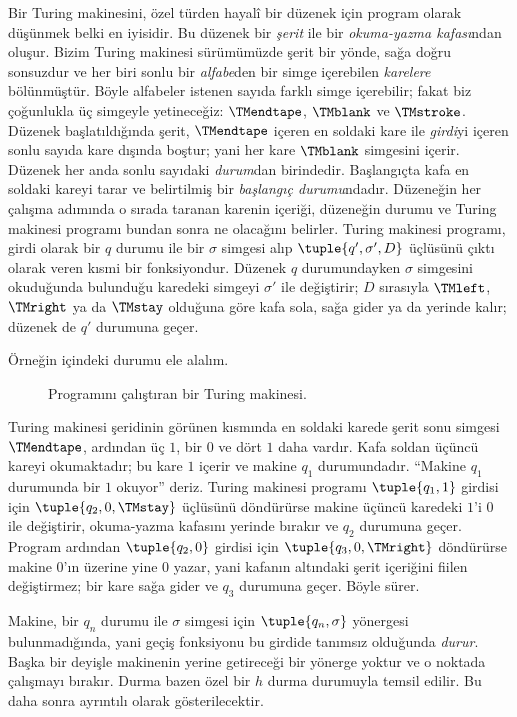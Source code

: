 \begin{explain}
Bir Turing makinesini, özel türden hayalî bir düzenek için program olarak
düşünmek belki en iyisidir. Bu düzenek bir \emph{şerit} ile bir
\emph{okuma-yazma kafası}ndan oluşur. Bizim Turing makinesi sürümümüzde şerit
bir yönde, sağa doğru sonsuzdur ve her biri sonlu bir \emph{alfabe}den bir
simge içerebilen \emph{karelere} bölünmüştür. Böyle alfabeler istenen sayıda
farklı simge içerebilir; fakat biz çoğunlukla üç simgeyle yetineceğiz:
$\TMendtape$, $\TMblank$ ve $\TMstroke$. Düzenek başlatıldığında şerit,
$\TMendtape$ içeren en soldaki kare ile \emph{girdi}yi içeren sonlu sayıda
kare dışında boştur; yani her kare $\TMblank$ simgesini içerir. Düzenek her
anda sonlu sayıdaki \emph{durum}dan birindedir. Başlangıçta kafa en soldaki
kareyi tarar ve belirtilmiş bir \emph{başlangıç durumu}ndadır. Düzeneğin her
çalışma adımında o sırada taranan karenin içeriği, düzeneğin durumu ve Turing
makinesi programı bundan sonra ne olacağını belirler. Turing makinesi programı,
girdi olarak bir $q$ durumu ile bir $\sigma$ simgesi alıp
$\tuple{q',\sigma',D}$ üçlüsünü çıktı olarak veren kısmi bir fonksiyondur.
Düzenek $q$ durumundayken $\sigma$ simgesini okuduğunda bulunduğu karedeki
simgeyi $\sigma'$ ile değiştirir; $D$ sırasıyla $\TMleft$, $\TMright$ ya da
$\TMstay$ olduğuna göre kafa sola, sağa gider ya da yerinde kalır; düzenek
de $q'$ durumuna geçer.

Örneğin  içindeki durumu ele alalım.
\begin{figure}
  \caption{Programını çalıştıran bir Turing makinesi.}
\end{figure}
Turing makinesi şeridinin görünen kısmında en soldaki karede şerit sonu
simgesi $\TMendtape$, ardından üç $1$, bir $0$ ve dört $1$ daha vardır.
Kafa soldan üçüncü kareyi okumaktadır; bu kare $1$ içerir ve makine
$q_1$ durumundadır. ``Makine $q_1$ durumunda bir $1$ okuyor'' deriz. Turing
makinesi programı $\tuple{q_1,1}$ girdisi için
$\tuple{q_2,0,\TMstay}$ üçlüsünü döndürürse makine üçüncü karedeki $1$'i
$0$ ile değiştirir, okuma-yazma kafasını yerinde bırakır ve $q_2$ durumuna
geçer. Program ardından $\tuple{q_2,0}$ girdisi için
$\tuple{q_3,0,\TMright}$ döndürürse makine $0$'ın üzerine yine $0$ yazar,
yani kafanın altındaki şerit içeriğini fiilen değiştirmez; bir kare sağa
gider ve $q_3$ durumuna geçer. Böyle sürer.

Makine, bir $q_n$ durumu ile $\sigma$ simgesi için
$\tuple{q_n,\sigma}$ yönergesi bulunmadığında, yani geçiş fonksiyonu bu
girdide tanımsız olduğunda \emph{durur}. Başka bir deyişle makinenin yerine
getireceği bir yönerge yoktur ve o noktada çalışmayı bırakır. Durma bazen
özel bir $h$ durma durumuyla temsil edilir. Bu daha sonra ayrıntılı olarak
gösterilecektir.
\end{explain}

